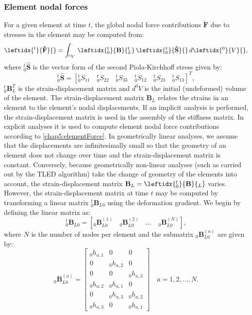 		\subsubsection*{Element nodal forces}
For a given element at time $ t $, the global nodal force contributions $ \mathbf{\tilde{F}} $ due to stresses in the element may be computed from:
\begin{equation}
\label{chap5:elementForce}
\leftidx{^t}{ \mathbf{\tilde{F}} }{} = \int_{^0 V} \, \leftidx{_0^t}{ \mathbf{B} }{_L^t} \, \leftidx{_0^t}{ \mathbf{\hat{S}} }{} \, d\leftidx{^0}{ V }{},
\end{equation}
where $ _0^t\mathbf{\hat{S}} $ is the vector form of the second Piola-Kirchhoff stress given by:
\begin{equation}
_0^t\mathbf{\hat{S}} = \left[ _0^t S_{11} \quad _0^t S_{22} \quad _0^t S_{33} \quad _0^t S_{12} \quad _0^t S_{23} \quad _0^t S_{13} \right] ^T,
\end{equation}
$ _0^t\mathbf{B}^T_L $ is the strain-displacement matrix and $ d^0V $ is the initial (undeformed) volume of the element. The strain-displacement matrix $ \mathbf{B}_L $ relates the strains in an element to the element's nodal displacements. If an implicit analysis is performed, the strain-displacement matrix is used in the assembly of the stiffness matrix. In explicit analyses it is used to compute element nodal force contributions according to \eqref{chap5:elementForce}. In geometrically linear analyses, we assume that the displacements are infinitesimally small so that the geometry of an element does not change over time and the strain-displacement matrix is constant. Conversely, because geometrically non-linear analyses (such as carried out by the TLED algorithm) take the change of geometry of the elements into account, the strain-displacement matrix $ \mathbf{B}_L = \leftidx{_0^t}{\mathbf{B}}{_L} $ varies. However, the strain-displacement matrix at time $ t $ may be computed by transforming a linear matrix $ _0^t\mathbf{B}_{L0} $ using the deformation gradient. We begin by defining the linear matrix as:
\begin{equation}
_0^t\mathbf{B}_{L0} = \left[ _0\mathbf{B}_{L0}^{(1)} \quad _0\mathbf{B}_{L0}^{(2)} \quad \ldots \quad _0\mathbf{B}_{L0}^{(N)} \right],
\end{equation}
where $ N $ is the number of nodes per element and the submatrix $ _0\mathbf{B}_{L0}^{(a)}  $ are given by:
\begin{equation}
_0\mathbf{B}_{L0}^{(a)} =
	\begin{bmatrix}
	_0 h_{a,1} & 0 & 0 \\
	0 & _0 h_{a,2} & 0 \\
	0 & 0 & _0 h_{a,3} \\
	_0 h_{a,2} & _0 h_{a,1} & 0 \\
	0 & _0 h_{a,3} & _0 h_{a,2} \\
	_0 h_{a,3} & 0 & _0 h_{a,1}
	\end{bmatrix}
\quad a = 1, 2, \ldots, N.
\end{equation}
